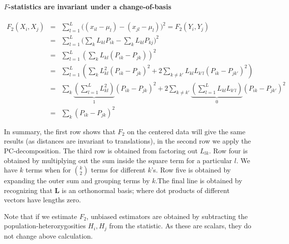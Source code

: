 \documentclass[12pt,fullpage, a4paper]{article}
\newcommand{\ML}{\mathbf{L}} %
\begin{document}
\paragraph{$F$-statistics are invariant under a change-of-basis}
\begin{eqnarray}
F_2(X_i, X_j) &=& \sum_{l=1}^L \big( (x_{il} - \mu_l) -(x_{jl} -\mu_l)\big)^2 = F_2(Y_i, Y_j)\nonumber\\
&=& \sum_{l=1}^L \big( \sum_k L_{kl}P_{ik} - \sum_kL_{kl}P_{kj}\big)^2\nonumber\\
&=& \sum_{l=1}^L \left( \sum_k L_{kl} (P_{ik} -P_{jk}) \right)^2\nonumber\\
&=& \sum_{l=1}^L \left( \sum_k L_{kl}^2 (P_{ik} -P_{jk})^2 + 2\sum_{k\neq k'} L_{kl}L_{k'l}(P_{ik} - P_{jk'})^2 \right)\nonumber\\
&=& \sum_k \underbrace{\left(\sum_{l=1}^L L_{kl}^2\right)}_1 (P_{ik} -P_{jk})^2 + 2\sum_{k\neq k'}\underbrace{\left(\sum_{l=1}^L L_{kl}L_{k'l}\right)}_{0} (P_{ik} - P_{jk'})^2\nonumber\\
&=& \sum_k (P_{ik} - P_{jk})^2 \label{eq:changeofbasis}
\end{eqnarray}

In summary, the first row shows that $F_2$ on the centered data will give the same results (as distances are invariant to translations), in the second row we apply the PC-decomposition. The third row is obtained from factoring out $L_{lk}$. Row four is obtained by multiplying out the sum inside the square term for a particular $l$. We have $k$ terms when for $\binom{k}{2}$ terms for different $k$'s.  Row five is obtained by expanding the outer sum and grouping terms by $k$.The final line is obtained by recognizing that $\ML$ is an orthonormal basis; where dot products of different vectors have lengths zero.

Note that if we estimate $F_2$, unbiased estimators are obtained by subtracting the population-heterozygosities $H_i, H_j$ from the statistic. As these are scalars, they do not change above calculation.
\end{document}
